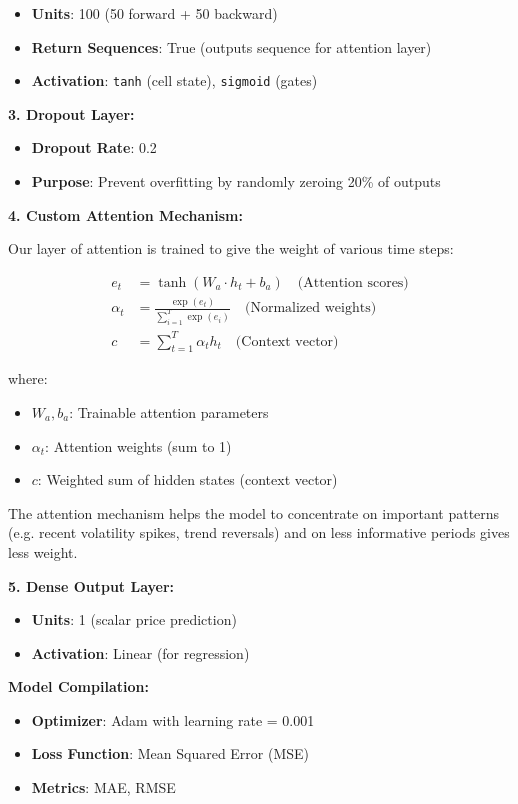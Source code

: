 \documentclass[12pt,a4paper]{article}
\begin{document}
\begin{itemize}
    \item \textbf{Units}: 100 (50 forward + 50 backward)
    \item \textbf{Return Sequences}: True (outputs sequence for attention layer)
    \item \textbf{Activation}: \texttt{tanh} (cell state), \texttt{sigmoid} (gates)
\end{itemize}

\textbf{3. Dropout Layer:}
\begin{itemize}
    \item \textbf{Dropout Rate}: 0.2
    \item \textbf{Purpose}: Prevent overfitting by randomly zeroing 20\% of outputs
\end{itemize}

\textbf{4. Custom Attention Mechanism:}

Our layer of attention is trained to give the weight of various time steps:

\begin{align}
e_t &= \tanh(W_a \cdot h_t + b_a) \quad \text{(Attention scores)} \\
\alpha_t &= \frac{\exp(e_t)}{\sum_{i=1}^{T} \exp(e_i)} \quad \text{(Normalized weights)} \\
c &= \sum_{t=1}^{T} \alpha_t h_t \quad \text{(Context vector)}
\end{align}

where:
\begin{itemize}
    \item $W_a, b_a$: Trainable attention parameters
    \item $\alpha_t$: Attention weights (sum to 1)
    \item $c$: Weighted sum of hidden states (context vector)
\end{itemize}

The attention mechanism helps the model to concentrate on important patterns (e.g. recent volatility spikes, trend reversals) and on less informative periods gives less weight.

\textbf{5. Dense Output Layer:}
\begin{itemize}
    \item \textbf{Units}: 1 (scalar price prediction)
    \item \textbf{Activation}: Linear (for regression)
\end{itemize}

\textbf{Model Compilation:}
\begin{itemize}
    \item \textbf{Optimizer}: Adam with learning rate = 0.001
    \item \textbf{Loss Function}: Mean Squared Error (MSE)
    \item \textbf{Metrics}: MAE, RMSE
\end{itemize}
\end{document}
